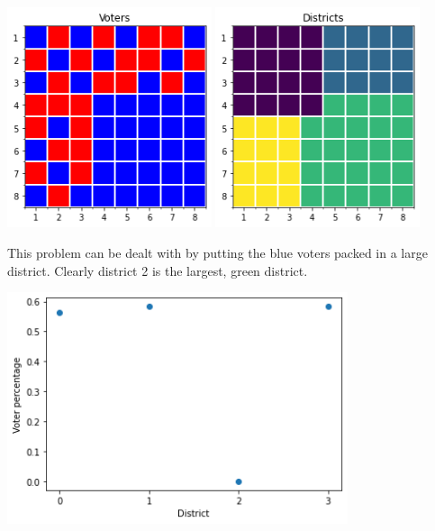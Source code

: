 \documentclass[12pt]{article}
\numberwithin{equation}{section}
\begin{document}
    \includegraphics[width=0.45\textwidth]{figures/voters.png}
    \includegraphics[width=0.45\textwidth]{figures/districts.png}
    
    This problem can be dealt with by putting the blue voters packed in a large district. Clearly district 2 is the largest, green district.
    
    \begin{center}
        \includegraphics[width=0.75\textwidth]{figures/percentage.png}
    \end{center}
\end{document}
